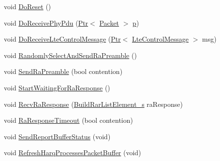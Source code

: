 \begin{DoxyCompactItemize}
void \hyperlink{classns3_1_1LteUeMac_ac09e77cbd0034771bc2419d43b2bb5d7}{Do\+Reset} ()
\item 
void \hyperlink{classns3_1_1LteUeMac_a7814ef531327320ffa1bf4913fa7a10f}{Do\+Receive\+Phy\+Pdu} (\hyperlink{classns3_1_1Ptr}{Ptr}$<$ \hyperlink{classns3_1_1Packet}{Packet} $>$ \hyperlink{lte__link__budget__x2__handover__measures_8m_ac9de518908a968428863f829398a4e62}{p})
\item 
void \hyperlink{classns3_1_1LteUeMac_a95cdea8ecb74801b20f9883af6f27d81}{Do\+Receive\+Lte\+Control\+Message} (\hyperlink{classns3_1_1Ptr}{Ptr}$<$ \hyperlink{classns3_1_1LteControlMessage}{Lte\+Control\+Message} $>$ msg)
\item 
void \hyperlink{classns3_1_1LteUeMac_adde9572bc280b188a467be8868a87f14}{Randomly\+Select\+And\+Send\+Ra\+Preamble} ()
\item 
void \hyperlink{classns3_1_1LteUeMac_af12f81d4d148f3f592f428311eac6d52}{Send\+Ra\+Preamble} (bool contention)
\item 
void \hyperlink{classns3_1_1LteUeMac_aede33dea80e7d4081d440a8d248edd90}{Start\+Waiting\+For\+Ra\+Response} ()
\item 
void \hyperlink{classns3_1_1LteUeMac_a77ec93865861de0a63e8ec82c129d5ef}{Recv\+Ra\+Response} (\hyperlink{structns3_1_1BuildRarListElement__s}{Build\+Rar\+List\+Element\+\_\+s} ra\+Response)
\item 
void \hyperlink{classns3_1_1LteUeMac_a19488a21b439bf9eb830ccb2fdee32a4}{Ra\+Response\+Timeout} (bool contention)
\item 
void \hyperlink{classns3_1_1LteUeMac_ad3688008bb09f75879e9e6348e687ac5}{Send\+Report\+Buffer\+Status} (void)
\item 
void \hyperlink{classns3_1_1LteUeMac_a60423851fd0dc980a188992d5837b354}{Refresh\+Harq\+Processes\+Packet\+Buffer} (void)
\end{DoxyCompactItemize}

